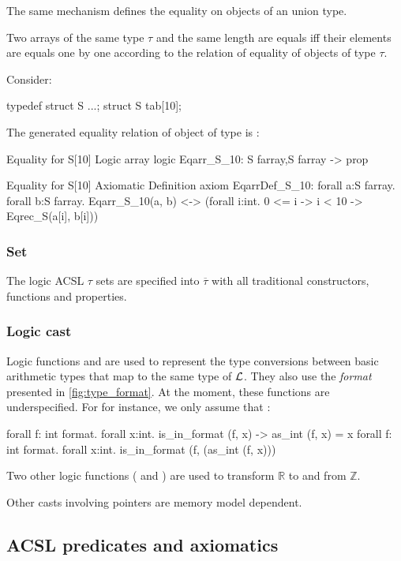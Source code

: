    The same mechanism defines the equality on objects of an union type. \par


   Two arrays of the same type $\tau$ and the same length are equals iff 
   their elements are equals one by one according to the relation 
   of equality of objects of type $\tau$. 
  
   Consider: 
   \begin{ccode}
     typedef struct S { ...}; 
     struct S tab[10];
   \end{ccode}
   

   The generated equality relation of object of type 
   is : 
   \begin{whycode}
Equality for S[10]
Logic array
logic Eqarr_S_10: S farray,S farray -> prop

Equality for S[10]
Axiomatic Definition
axiom EqarrDef_S_10:
  forall a:S farray.
  forall b:S farray.
      Eqarr_S_10(a, b)
  <-> (forall i:int. 0 <= i -> i < 10 -> Eqrec_S(a[i], b[i]))


   \end{whycode}

 \subsubsection{Set}

  The logic \textsf{ACSL} $\tau$ sets are specified into
  $\overline{\tau}$  with all traditional constructors,
  functions and properties.


 \subsubsection{Logic cast}

 Logic functions  and  
 are used to represent the type conversions between 
 basic arithmetic types that map to the same type of  $\cal{L}$.
 They also use the {\it format} presented in \ref{fig:type_format}.
 At the moment, these functions are underspecified.
 For  for instance, we only assume that :
\begin{whycode}
forall f: int format. forall x:int. is_in_format (f, x) -> as_int (f, x) = x
forall f: int format. forall x:int. is_in_format (f, (as_int (f, x)))
\end{whycode}

Two other logic functions ( and
) are used to transform $\mathbb{R}$ to and from $\mathbb{Z}$.

Other casts involving pointers are memory model dependent.

\subsection{\textsf{ACSL} predicates and axiomatics} 


